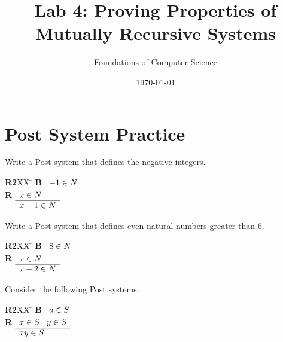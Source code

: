 \documentclass[]{exam}
\title{Lab 4: Proving Properties of Mutually Recursive Systems}
\author{Foundations of Computer Science}
\date{\today}
\theoremstyle{definition}
\begin{document}
\maketitle

\setlength{\columnseprule}{1pt}
\section*{Post System Practice}
\begin{questions}
\question Write a Post system that defines the negative integers.
\begin{solution}
\begin{tabbing}
{\bf R2}XX \=  \kill
{\bf B} \>
        \(\begin{array}[t]{l}
        -1 \in N
        \end{array}\) \\[2ex]
{\bf R} \>
        \(\begin{array}[t]{l}
        x \in N \\
        \hline
        x-1 \in N
        \end{array}\)
\end{tabbing}
\end{solution}
\question Write a Post system that defines even natural numbers greater than $6$.
\begin{solution}
\begin{tabbing}
{\bf R2}XX \=  \kill
{\bf B} \>
        \(\begin{array}[t]{l}
        8 \in N
        \end{array}\) \\[2ex]
{\bf R} \>
        \(\begin{array}[t]{l}
        x \in N \\
        \hline
        x+2 \in N
        \end{array}\)
\end{tabbing}
\end{solution}
\question Consider the following Post systems:
\begin{multicols}{2}
\begin{tabbing}
{\bf R2}XX \=  \kill
{\bf B} \>
        \(\begin{array}[t]{l}
        a \in S
        \end{array}\) \\[2ex]
{\bf R} \>
        \(\begin{array}[t]{l}
        x \in S \;\;\;y \in S \\
        \hline
        xy \in S
        \end{array}\)
\end{tabbing}


\end{multicols}
\end{questions}
\end{document}
